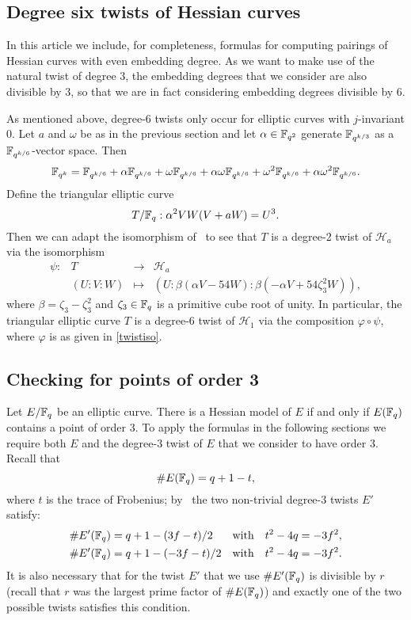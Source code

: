 \subsection{Degree six twists of Hessian curves}\label{sextic}

In this article we include, for completeness, formulas for computing pairings
of Hessian curves with even embedding degree. 
As we want to make use of the natural twist of degree 3, 
the embedding degrees that we consider are also divisible by 3, 
so that we are in fact considering embedding degrees divisible by 6.

As mentioned above, degree-6 twists only occur for elliptic curves
with $j$-invariant 0. 
Let $a$ and $\omega$ be as in the previous section
and let $\alpha \in \mathbb{F}_{q^2}$ generate $\mathbb{F}_{q^{k/3}}$ as a 
$\mathbb{F}_{q^{k/6}}$-vector space. Then
\[\mathbb{F}_{q^k} = \mathbb{F}_{q^{k/6}} + \alpha\mathbb{F}_{q^{k/6}} 
+\omega\mathbb{F}_{q^{k/6}} + \alpha\omega\mathbb{F}_{q^{k/6}}
+\omega^2\mathbb{F}_{q^{k/6}} + \alpha\omega^2\mathbb{F}_{q^{k/6}}.\] 
Define the triangular elliptic curve
\[T/\mathbb{F}_{q} : \alpha^2 VW(V + aW) = U^3.\]
Then we can adapt the isomorphism of~\cite[Theorem 5.3]{2015/hessian}
to see that $T$ is a degree-2 twist of $\mathcal{H}_a$ via
the isomorphism
\begin{equation}\label{quadtwist}
\begin{array}{rccc}
\psi: & T & \rightarrow & \mathcal{H}_a \\ 
& (U:V:W) & \mapsto &
(U:\beta(\alpha V - 54W) : \beta(-\alpha V + 54\zeta_3^2 W)),
\end{array}
\end{equation}
where $\beta = \zeta_3-\zeta_3^2$ and 
$\zeta_3 \in \mathbb{F}_{q}$ is a primitive cube root of unity.
In particular, the triangular elliptic curve $T$ is a degree-6 twist of $\mathcal{H}_1$ via the composition $\varphi \circ \psi$,
where $\varphi$ is as given in \eqref{twistiso}.

\subsection{Checking for points of order 3}\label{twist}

Let $E/\mathbb{F}_{q}$ be an elliptic curve. There is a Hessian model of $E$ if and only if $E(\mathbb{F}_{q})$ contains a point of order 3. 
To apply the formulas in the following sections we require both $E$ and the 
degree-3 twist of $E$ that we consider to have order 3.
Recall that
$$\#E(\mathbb{F}_{q}) = q+1-t,$$
where $t$ is the trace of Frobenius; 
by~\cite{2006/hess} the two non-trivial degree-3 twists $E'$ satisfy:
\begin{align*}
\# E' (\mathbb{F}_{q}) &= q + 1 - (3f - t) / 2 & \text{with} & \quad t^2 - 4q = -3f^2, \\
\# E' (\mathbb{F}_{q}) &= q + 1 - (-3f- t) / 2 & \text{with} & \quad t^2 - 4q = -3f^2.
\end{align*}
It is also necessary that for the twist $E'$ that we use $\#E'(\mathbb{F}_{q})$ is divisible by $r$ (recall that $r$ was the largest prime factor of $\# E(\mathbb{F}_{q})$) and exactly one of the two possible twists satisfies this condition.

